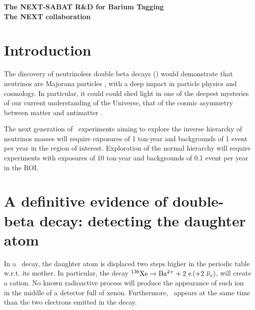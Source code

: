 \documentclass[a4paper,11pt]{article}
\begin{document}

%

%


\begin{center}
\huge
\textbf{The NEXT-SABAT R\&D for Barium Tagging} \\
\vspace{0.5cm}
\Large
\textbf{\centering The NEXT collaboration} \\ 

\end{center}


\section{Introduction}
The discovery of neutrinoless double beta decays (\bbonu) would demonstrate that neutrinos are Majorana particles \cite{Majorana:1937}, with a deep impact in particle physics and cosmology. In particular, it could could shed light in one of the deepest mysteries of our current understanding of the Universe, that of the cosmic asymmetry between matter and antimatter \cite{Sakharov1967}. 

The next generation of \bbonu\ experiments aiming to explore the inverse hierarchy of neutrinos masses will require exposures of 1 ton$\cdot$year and backgrounds of 1 event per year in the region of interest. Exploration of the normal hierarchy will require experiments with exposures of 10 ton$\cdot$year and backgrounds of 0.1 event per year in the ROI. 
\section{A definitive evidence of double-beta decay: detecting the daughter atom}

In a \bbonu\ decay, the daughter atom is displaced two steps higher in the periodic table w.r.t. its mother. In particular, the decay $\XE \rightarrow \Bapp + 2\ e \, (+ 2\ \overline{\nu}_{e})$, will create a \Bapp cation. No known radioactive process will produce the appearance of such ion in the middle of a detector full of xenon. Furthermore, \Bapp\ appears at the same time than the two electrons emitted in the decay. 
\end{document}
